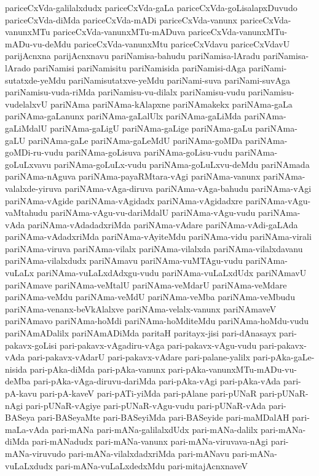 {pariceCxVda-galilalxdudx
pariceCxVda-gaLa
pariceCxVda-goLisalapxDuvudo
pariceCxVda-diMda
pariceCxVda-mADi
pariceCxVda-vanunx
pariceCxVda-vanunxMTu
pariceCxVda-vanunxMTu-mADuva
pariceCxVda-vanunxMTu-mADu-vu-deMdu
pariceCxVda-vanunxMtu
pariceCxVdavu
pariceCxVdavU
parijAcnxna
parijAcnxnavu
pariNamisa-bahudu
pariNamisa-lAradu
pariNamisa-lArado
pariNamisi
pariNamisitu
pariNamisida
pariNamisi-dAga
pariNami-sutatxde-yeMdu
pariNamisutatxve-yeMdu
pariNami-suva
pariNami-suvAga
pariNamisu-vuda-riMda
pariNamisu-vu-dilalx
pariNamisu-vudu
pariNamisu-vudelalxvU
pariNAma
pariNAma-kAlapxne
pariNAmakekx
pariNAma-gaLa
pariNAma-gaLanunx
pariNAma-gaLalUlx
pariNAma-gaLiMda
pariNAma-gaLiMdalU
pariNAma-gaLigU
pariNAma-gaLige
pariNAma-gaLu
pariNAma-gaLU
pariNAma-gaLe
pariNAma-gaLeMdU
pariNAma-goMDa
pariNAma-goMDi-ru-vudu
pariNAma-goLisuva
pariNAma-goLisu-vudu
pariNAma-goLuLxvavu
pariNAma-goLuLx-vudu
pariNAma-goLuLxvu-deMdu
pariNAmada
pariNAma-nAguva
pariNAma-payaRMtara-vAgi
pariNAma-vanunx
pariNAma-valalxde-yiruva
pariNAma-vAga-diruva
pariNAma-vAga-bahudu
pariNAma-vAgi
pariNAma-vAgide
pariNAma-vAgidadx
pariNAma-vAgidadxre
pariNAma-vAgu-vaMtahudu
pariNAma-vAgu-vu-dariMdalU
pariNAma-vAgu-vudu
pariNAma-vAda
pariNAma-vAdadadxriMda
pariNAma-vAdare
pariNAma-vAdi-gaLAda
pariNAma-vAdadxriMda
pariNAma-vAyiteMdu
pariNAma-vidu
pariNAma-virali
pariNAma-viruva
pariNAma-vilalx
pariNAma-vilalxda
pariNAma-vilalxdavanu
pariNAma-vilalxdudx
pariNAmavu
pariNAma-vuMTAgu-vudu
pariNAma-vuLaLx
pariNAma-vuLaLxdAdxgu-vudu
pariNAma-vuLaLxdUdx
pariNAmavU
pariNAmave
pariNAma-veMtalU
pariNAma-veMdarU
pariNAma-veMdare
pariNAma-veMdu
pariNAma-veMdU
pariNAma-veMba
pariNAma-veMbudu
pariNAma-venanx-beVkAlalxve
pariNAma-velalx-vanunx
pariNAmaveV
pariNAmavo
pariNAma-hoMdi
pariNAma-hoMditeMdu
pariNAma-hoMdu-vudu
pariNAmADalilx
pariNAmADiMda
paritaH
paritayx-jisi
pari-dAnasayx
pari-pakavx-goLisi
pari-pakavx-vAgadiru-vAga
pari-pakavx-vAgu-vudu
pari-pakavx-vAda
pari-pakavx-vAdarU
pari-pakavx-vAdare
pari-palane-yalilx
pari-pAka-gaLe-nisida
pari-pAka-diMda
pari-pAka-vanunx
pari-pAka-vanunxMTu-mADu-vu-deMba
pari-pAka-vAga-diruvu-dariMda
pari-pAka-vAgi
pari-pAka-vAda
pari-pA-kavu
pari-pA-kaveV
pari-pATi-yiMda
pari-pAlane
pari-pUNaR
pari-pUNaR-nAgi
pari-pUNaR-vAgiye
pari-pUNaR-vAgu-vudu
pari-pUNaR-vAda
pari-BASeya
pari-BASeyaMte
pari-BASeyiMda
pari-BASeyide
pari-maMDalAH
pari-maLa-vAda
pari-mANa
pari-mANa-galilalxdUdx
pari-mANa-dalilx
pari-mANa-diMda
pari-mANadudx
pari-mANa-vanunx
pari-mANa-viruvava-nAgi
pari-mANa-viruvudo
pari-mANa-vilalxdadxriMda
pari-mANavu
pari-mANa-vuLaLxdudx
pari-mANa-vuLaLxdedxMdu
pari-mitajAcnxnaveV
}

